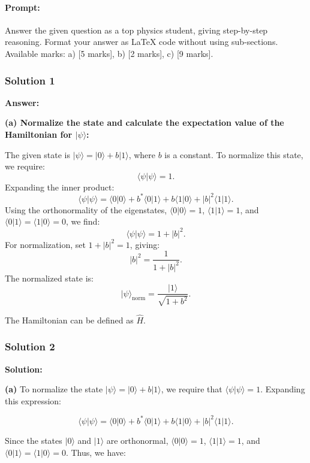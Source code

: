 \documentclass{article}
\begin{document}
\paragraph{Prompt: \\} 
Answer the given question as a top physics student, giving step-by-step reasoning. Format your answer as LaTeX code without using sub-sections. Available marks: a) [5 marks], b) [2 marks], c) [9 marks].

\subsubsection{Solution 1}
\textbf{Answer:}

\textbf{(a) Normalize the state and calculate the expectation value of the Hamiltonian for \(|\psi\rangle\):}

The given state is \(|\psi\rangle = |0\rangle + b |1\rangle\), where \(b\) is a constant. To normalize this state, we require:
\[
\langle \psi | \psi \rangle = 1.
\]
Expanding the inner product:
\[
\langle \psi | \psi \rangle = \langle 0 | 0 \rangle + b^* \langle 0 | 1 \rangle + b \langle 1 | 0 \rangle + |b|^2 \langle 1 | 1 \rangle.
\]
Using the orthonormality of the eigenstates, \(\langle 0 | 0 \rangle = 1\), \(\langle 1 | 1 \rangle = 1\), and \(\langle 0 | 1 \rangle = \langle 1 | 0 \rangle = 0\), we find:
\[
\langle \psi | \psi \rangle = 1 + |b|^2.
\]
For normalization, set \(1 + |b|^2 = 1\), giving:
\[
|b|^2 = \frac{1}{1 + |b|^2}.
\]
The normalized state is:
\[
|\psi\rangle_{\text{norm}} = \frac{|1\rangle}{\sqrt{1+b^2}}.
\]

The Hamiltonian can be defined as \(\hat{H}\).

\subsubsection{Solution 2}
\textbf{Solution:}

\textbf{(a)} To normalize the state \(|\psi\rangle = |0\rangle + b|1\rangle\), we require that \(\langle \psi | \psi \rangle = 1\). Expanding this expression:

\[
\langle \psi | \psi \rangle = \langle 0 | 0 \rangle + b^* \langle 0 | 1 \rangle + b \langle 1 | 0 \rangle + |b|^2 \langle 1 | 1 \rangle.
\]

Since the states \(|0\rangle\) and \(|1\rangle\) are orthonormal, \(\langle 0 | 0 \rangle = 1\), \(\langle 1 | 1 \rangle = 1\), and \(\langle 0 | 1 \rangle = \langle 1 | 0 \rangle = 0\). Thus, we have:
\end{document}

